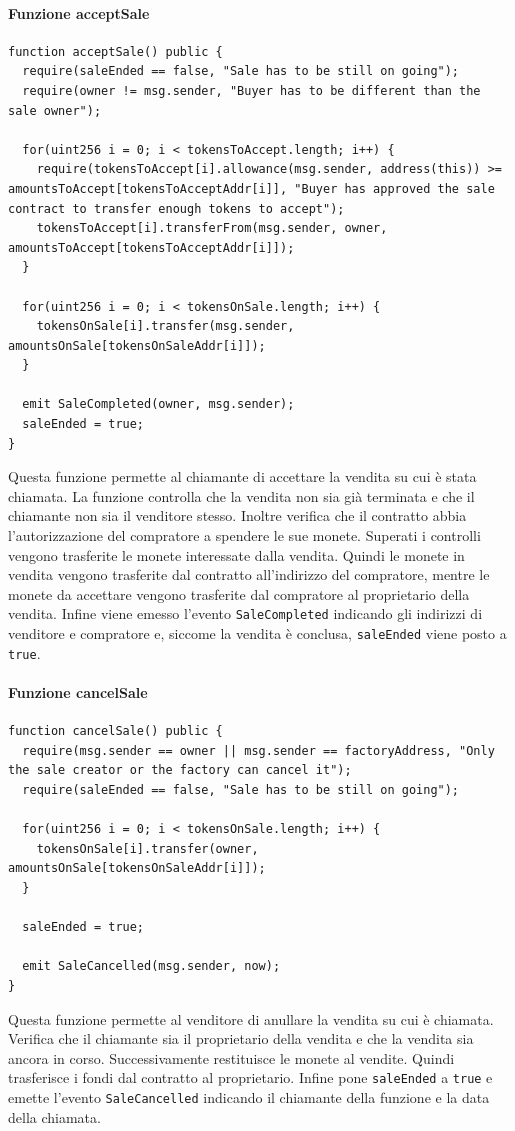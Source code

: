 \documentclass[a4paper]{article}
\begin{document}
        \paragraph{Funzione acceptSale}
\begin{lstlisting}[style=ES6, title={Funzione acceptSale()}]
function acceptSale() public {
  require(saleEnded == false, "Sale has to be still on going");
  require(owner != msg.sender, "Buyer has to be different than the sale owner");

  for(uint256 i = 0; i < tokensToAccept.length; i++) {
    require(tokensToAccept[i].allowance(msg.sender, address(this)) >= amountsToAccept[tokensToAcceptAddr[i]], "Buyer has approved the sale contract to transfer enough tokens to accept");
    tokensToAccept[i].transferFrom(msg.sender, owner, amountsToAccept[tokensToAcceptAddr[i]]);
  }
  
  for(uint256 i = 0; i < tokensOnSale.length; i++) {
    tokensOnSale[i].transfer(msg.sender, amountsOnSale[tokensOnSaleAddr[i]]);
  }
  
  emit SaleCompleted(owner, msg.sender);
  saleEnded = true;
}\end{lstlisting}
        Questa funzione permette al chiamante di accettare la vendita su cui è stata chiamata. La funzione controlla che la vendita non sia già terminata e che il chiamante non sia il venditore stesso.
        Inoltre verifica che il contratto abbia l'autorizzazione del compratore a spendere le sue monete. Superati i controlli vengono trasferite le monete interessate dalla vendita. Quindi le monete in vendita vengono trasferite dal contratto all'indirizzo del compratore,
        mentre le monete da accettare vengono trasferite dal compratore al proprietario della vendita. Infine viene emesso l'evento \verb|SaleCompleted| indicando gli indirizzi di venditore e compratore e, siccome la vendita è conclusa, \verb|saleEnded| viene posto a \verb|true|.
        \paragraph{Funzione cancelSale}
\begin{lstlisting}[style=ES6, title={Funzione cancelSale()}]
function cancelSale() public {
  require(msg.sender == owner || msg.sender == factoryAddress, "Only the sale creator or the factory can cancel it");
  require(saleEnded == false, "Sale has to be still on going");

  for(uint256 i = 0; i < tokensOnSale.length; i++) {
    tokensOnSale[i].transfer(owner, amountsOnSale[tokensOnSaleAddr[i]]);
  }
  
  saleEnded = true;

  emit SaleCancelled(msg.sender, now);
}\end{lstlisting}
        Questa funzione permette al venditore di anullare la vendita su cui è chiamata. Verifica che il chiamante sia il proprietario della vendita e che la vendita sia ancora in corso. Successivamente restituisce le monete al vendite. Quindi trasferisce i fondi dal contratto al proprietario.
        Infine pone \verb|saleEnded| a \verb|true| e emette l'evento \verb|SaleCancelled| indicando il chiamante della funzione e la data della chiamata.
\end{document}
